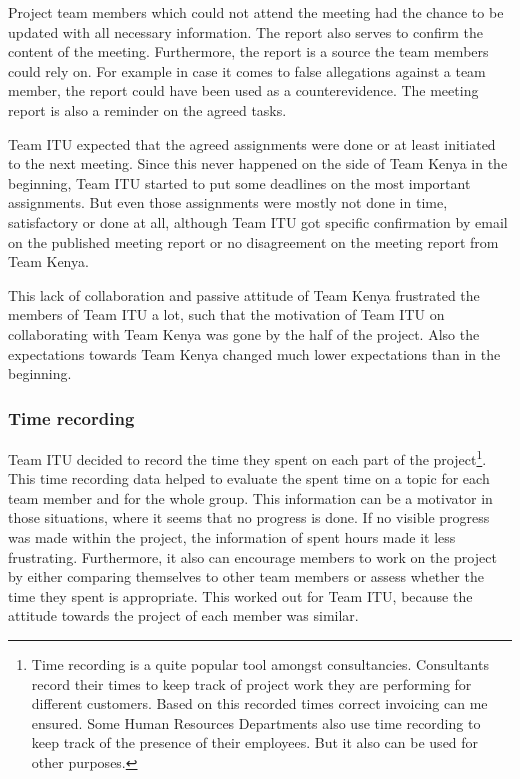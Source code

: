 Project team members which could not attend the meeting had the chance to be updated with all necessary information. The report also serves to confirm the content of the meeting. Furthermore, the report is a source the team members could rely on. For example in case it comes to false allegations against a team member, the report could have been used as a counterevidence. The meeting report is also a reminder on the agreed tasks.

Team ITU expected that the agreed assignments were done or at least initiated to the next meeting. Since this never happened on the side of Team Kenya in the beginning, Team ITU started to put some deadlines on the most important assignments. But even those assignments were mostly not done in time, satisfactory or done at all, although Team ITU got specific confirmation by email on the published meeting report or no disagreement on the meeting report from Team Kenya.

This lack of collaboration and passive attitude of Team Kenya frustrated the members of Team ITU a lot, such that the motivation of Team ITU on collaborating with Team Kenya was gone by the half of the project. Also the expectations towards Team Kenya changed much lower expectations than in the beginning.


\subsubsection {Time recording}
\label{sec:time_recording}
Team ITU decided to record the time they spent on each part of the project\footnote{Time recording is a quite popular tool amongst consultancies. Consultants record their times to keep track of project work they are performing for different customers. Based on this recorded times correct invoicing can me ensured. Some Human Resources Departments also use time recording to keep track of the presence of their employees. But it also can be used for other purposes.}. This time recording data helped to evaluate the spent time on a topic for each team member and for the whole group. This information can be a motivator in those situations, where it seems that no progress is done. If no visible progress was made within the project, the information of spent hours made it less frustrating. Furthermore, it also can encourage members to work on the project by either comparing themselves to other team members or assess whether the time they spent is appropriate. This worked out for Team ITU, because the attitude towards the project of each member was similar.

